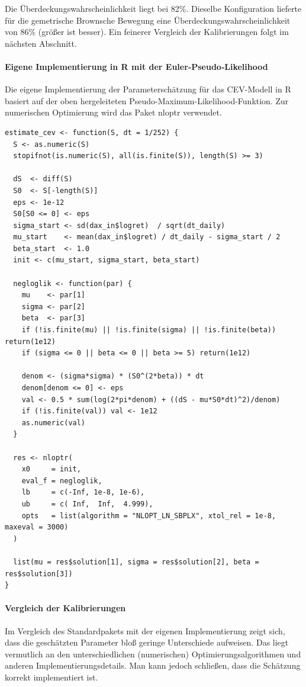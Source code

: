 Die Überdeckungswahrscheinlichkeit liegt bei 82\%. Dieselbe Konfiguration
lieferte für die gemetrische Brownsche Bewegung eine Überdeckungswahrscheinlichkeit von 86\% (größer ist besser).
Ein feinerer Vergleich der Kalibrierungen folgt im nächsten Abschnitt. 

\paragraph{Eigene Implementierung in R mit der Euler‑Pseudo‑Likelihood}
Die eigene Implementierung der Parameterschätzung für das CEV-Modell in R basiert auf der oben hergeleiteten Pseudo-Maximum-Likelihood-Funktion.
Zur numerischen Optimierung wird das Paket nloptr \cite{nloptr} verwendet.

\begin{lstlisting}
estimate_cev <- function(S, dt = 1/252) {
  S <- as.numeric(S)
  stopifnot(is.numeric(S), all(is.finite(S)), length(S) >= 3)
  
  dS  <- diff(S)
  S0  <- S[-length(S)]
  eps <- 1e-12
  S0[S0 <= 0] <- eps
  sigma_start <- sd(dax_in$logret)  / sqrt(dt_daily)
  mu_start    <- mean(dax_in$logret) / dt_daily - sigma_start / 2
  beta_start  <- 1.0
  init <- c(mu_start, sigma_start, beta_start) 
  
  negloglik <- function(par) {
    mu    <- par[1]
    sigma <- par[2]
    beta  <- par[3]
    if (!is.finite(mu) || !is.finite(sigma) || !is.finite(beta)) return(1e12)
    if (sigma <= 0 || beta <= 0 || beta >= 5) return(1e12)
    
    denom <- (sigma*sigma) * (S0^(2*beta)) * dt
    denom[denom <= 0] <- eps
    val <- 0.5 * sum(log(2*pi*denom) + ((dS - mu*S0*dt)^2)/denom)
    if (!is.finite(val)) val <- 1e12
    as.numeric(val)
  }
  
  res <- nloptr(
    x0     = init,
    eval_f = negloglik,
    lb     = c(-Inf, 1e-8, 1e-6),
    ub     = c( Inf,  Inf,  4.999),
    opts   = list(algorithm = "NLOPT_LN_SBPLX", xtol_rel = 1e-8, maxeval = 3000)
  )
  
  list(mu = res$solution[1], sigma = res$solution[2], beta = res$solution[3])
}
\end{lstlisting}

\paragraph{Vergleich der Kalibrierungen}
Im Vergleich des Standardpakets mit der eigenen Implementierung zeigt sich, dass die geschätzten Parameter bloß geringe Unterschiede aufweisen.
Das liegt vermutlich an den unterschiedlichen (numerischen) Optimierungsalgorithmen und anderen Implementierungsdetails. Man kann jedoch
schließen, dass die Schätzung korrekt implementiert ist.

